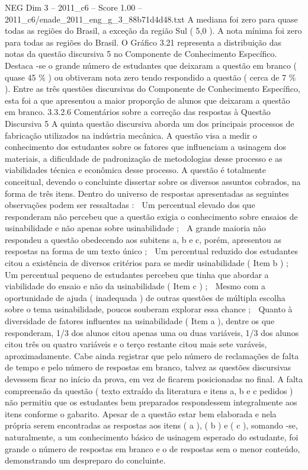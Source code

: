 \begin{textsample}{NEG Dim 3 – 2011\_c6 – Score 1.00 – 2011\_c6/enade\_2011\_eng\_g\_3\_88b71d4d48.txt}
A mediana foi zero para quase todas as regiões do Brasil, a exceção da região Sul ( 5,0 ).
A nota mínima foi zero para todas as regiões do Brasil.
O Gráfico 3.21 representa a distribuição das notas da questão discursiva 5 no Componente de Conhecimento Específico.
Destaca -se o grande número de estudantes que deixaram a questão em branco ( quase 45 \% ) ou obtiveram nota zero tendo respondido a questão ( cerca de 7 \% ).
Entre as três questões discursivas do Componente de Conhecimento Específico, esta foi a que apresentou a maior proporção de alunos que deixaram a questão em branco. 3.3.2.6 Comentários sobre a correção das respostas à Questão Discursiva 5 A quinta questão discursiva aborda um dos principais processos de fabricação utilizados na indústria mecânica.
A questão visa a medir o conhecimento dos estudantes sobre os fatores que influenciam a usinagem dos materiais, a dificuldade de padronização de metodologias desse processo e as viabilidades técnica e econômica desse processo.
A questão é totalmente conceitual, devendo o concluinte dissertar sobre os diversos assuntos cobrados, na forma de três itens.
Dentro do universo de respostas apresentadas as seguintes observações podem ser ressaltadas :  Um percentual elevado dos que responderam não percebeu que a questão exigia o conhecimento sobre ensaios de usinabilidade e não apenas sobre usinabilidade ;  A grande maioria não respondeu a questão obedecendo aos subitens a, b e c, porém, apresentou as respostas na forma de um texto único ;  Um percentual reduzido dos estudantes citou a existência de diversos critérios para se medir usinabilidade ( Item b ) ;  Um percentual pequeno de estudantes percebeu que tinha que abordar a viabilidade do ensaio e não da usinabilidade ( Item c ) ;  Mesmo com a oportunidade de ajuda ( inadequada ) de outras questões de múltipla escolha sobre o tema usinabilidade, poucos souberam explorar essa chance ;  Quanto à diversidade de fatores influentes na usinabilidade ( Item a ), dentre os que responderam, 1/3 dos alunos citou apenas uma ou duas variáveis, 1/3 dos alunos citou três ou quatro variáveis e o terço restante citou mais sete varáveis, aproximadamente.
Cabe ainda registrar que pelo número de reclamações de falta de tempo e pelo número de respostas em branco, talvez as questões discursivas devessem ficar no início da prova, em vez de ficarem posicionadas no final.
A falta compreensão da questão ( texto extraído da literatura e itens a, b e c pedidos ) não permitiu que os estudantes bem preparados respondessem integralmente aos itens conforme o gabarito.
Apesar de a questão estar bem elaborada e nela própria serem encontradas as respostas aos itens ( a ), ( b ) e ( c ), somando -se, naturalmente, a um conhecimento básico de usinagem esperado do estudante, foi grande o número de respostas em branco e o de respostas sem o menor conteúdo, demonstrando um despreparo do concluinte.

\end{textsample}
